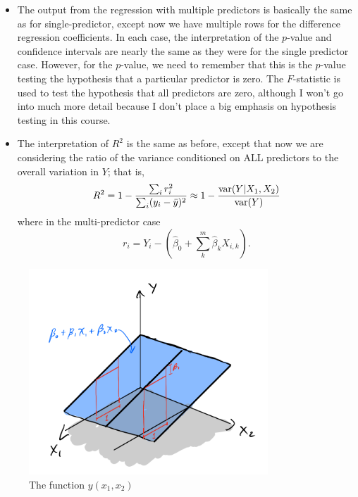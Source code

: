 \begin{itemize}
\item The output from the regression with multiple predictors is basically the same as for single-predictor, except now we have multiple rows for the difference regression coefficients. In each case, the interpretation of the $p$-value and confidence intervals are nearly the same as they were for the single predictor case. However, for the $p$-value, we need to remember that this is the $p$-value testing the hypothesis that a particular predictor is zero. The $F$-statistic is used to test the hypothesis that all predictors are zero, although I won't go into much more detail because I don't place a big emphasis on hypothesis testing in this course. 

\item The interpretation of $R^2$ is the same as before, except that now we are considering the ratio of the variance conditioned on ALL predictors to the overall variation in $Y$; that is, 
\begin{equation*}
R^2 = 1 - \frac{\sum_i r_i^2}{\sum_i (y_i - \bar{y})^2}    \approx 1 - \frac{{\rm var}(Y|X_1,X_2)}{{\rm var}(Y)}
\end{equation*} 
where in the multi-predictor case 
\begin{equation}
r_i = Y_i - \left(\hat{\beta}_0 + \sum_k^m \hat{\beta}_kX_{i,k}\right). 
\end{equation} 

\end{itemize}



\begin{figure}[h!]
    \centering
    \includegraphics[width=0.8\textwidth]{./../figures/plane}
    \caption{The function $y(x_1,x_2)$}
    \label{fig:plane}
\end{figure}

